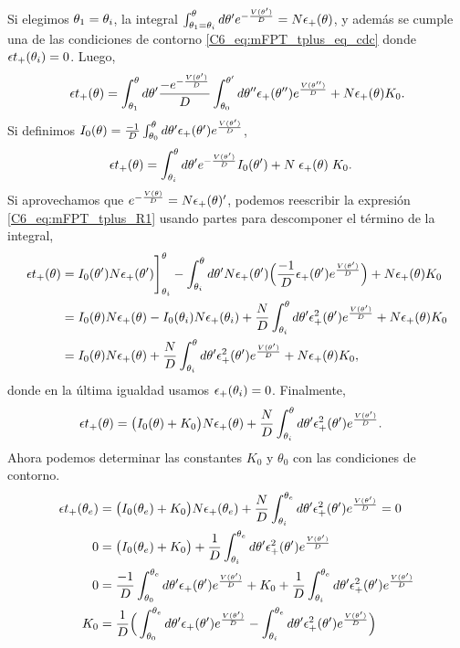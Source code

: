 \documentclass[./main.tex]{subfiles}
\begin{document}
Si elegimos $\theta_1 = \theta_i$, la integral $\int_{\theta_1 = \theta_i}^{\theta} d\theta'  e^{- \frac{V(\theta')}{D}} = N \epsilon_{+}(\theta)$, y además se cumple una de las condiciones de contorno \ref{C6_eq:mFPT_tplus_eq_cdc} donde $\epsilon t_+(\theta_i) = 0$. Luego,
\begin{align}
   \epsilon t_+(\theta) = \int_{\theta_1}^{\theta} d\theta'  \frac{- e^{- \frac{V(\theta')}{D}} }{D} \int_{\theta_0}^{\theta'} d \theta'' \epsilon_{+}(\theta'') e^{ \frac{V(\theta'')}{D}} + N \epsilon_{+}(\theta) K_0 .
\end{align}
Si definimos $I_0(\theta) =  \frac{-1}{D} \int_{\theta_0}^\theta d \theta' \epsilon_{+}(\theta') e^{ \frac{V(\theta')}{D}}$, 
\begin{align}
   \epsilon t_+(\theta) &= \int_{\theta_i}^{\theta} d\theta'  e^{- \frac{V(\theta')}{D}}  I_0(\theta')+  N \; \epsilon_{+}(\theta) \; K_0 .
   \label{C6_eq:mFPT_tplus_R1}
\end{align}
Si aprovechamos que $ e^{- \frac{V(\theta)}{D}} = N \epsilon_{+}(\theta)'$, podemos reescribir la expresión \ref{C6_eq:mFPT_tplus_R1} usando partes para descomponer el término de la integral,
\begin{align}
   \epsilon t_+(\theta) &= I_0(\theta') N \epsilon_{+}(\theta') \Bigg]_{\theta_i}^{\theta} - \int_{\theta_i}^{\theta} d\theta' N \epsilon_{+}(\theta') \Big(\frac{-1}{D} \epsilon_{+}(\theta') e^{ \frac{V(\theta')}{D}} \Big) +  N \epsilon_{+}(\theta) K_0 \\
            &= I_0(\theta) N \epsilon_{+}(\theta) - I_0(\theta_i) N \epsilon_{+}(\theta_i) + \frac{N}{D} \int_{\theta_i}^{\theta} d\theta'  \epsilon_{+}^2(\theta') e^{ \frac{V(\theta')}{D}} +  N \epsilon_{+}(\theta) K_0 \\
            &= I_0(\theta) N \epsilon_{+}(\theta) + \frac{N}{D} \int_{\theta_i}^{\theta} d\theta'  \epsilon_{+}^2(\theta') e^{ \frac{V(\theta')}{D}} +  N \epsilon_{+}(\theta) K_0 ,
\end{align}
donde en la última igualdad usamos $\epsilon_{+}(\theta_i) = 0$. Finalmente, 
\begin{align}
   \epsilon t_+(\theta) &= \big(I_0(\theta)+K_0\big) N \epsilon_{+}(\theta) + \frac{N}{D} \int_{\theta_i}^{\theta} d\theta'  \epsilon_{+}^2(\theta') e^{ \frac{V(\theta')}{D}}. 
\end{align}
Ahora podemos determinar las constantes $K_0$ y $\theta_0$ con las condiciones de contorno.
\begin{align}
   \epsilon t_+(\theta_e) &= \big(I_0(\theta_e)+K_0\big) N \epsilon_{+}(\theta_e) + \frac{N}{D} \int_{\theta_i}^{\theta_e} d\theta'  \epsilon_{+}^2(\theta') e^{ \frac{V(\theta')}{D}} = 0\\
   0&=\big(I_0(\theta_e)+K_0\big) + \frac{1}{D} \int_{\theta_i}^{\theta_e} d\theta'  \epsilon_{+}^2(\theta') e^{ \frac{V(\theta')}{D}} \\
   0&=\frac{-1}{D} \int_{\theta_0}^{\theta_e} d \theta' \epsilon_{+}(\theta') e^{ \frac{V(\theta')}{D}} +K_0 + \frac{1}{D} \int_{\theta_i}^{\theta_e} d\theta'  \epsilon_{+}^2(\theta') e^{ \frac{V(\theta')}{D}} \\
   K_0 &= \frac{1}{D} \Big( \int_{\theta_0}^{\theta_e} d \theta' \epsilon_{+}(\theta') e^{ \frac{V(\theta')}{D}} - \int_{\theta_i}^{\theta_e} d\theta'  \epsilon_{+}^2(\theta') e^{ \frac{V(\theta')}{D}}\Big)
\end{align}
\end{document}

